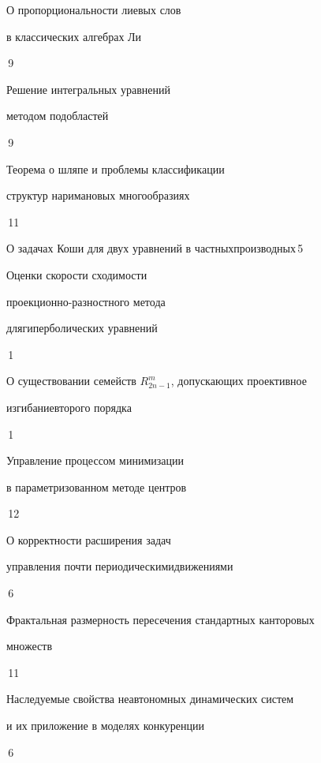 

{О пропорциональности лиевых слов 


в классических алгебрах Ли}{\No\,9}




{Решение интегральных уравнений


методом подобластей}{\No\,9}




{Теорема о шляпе и проблемы классификации 


структур на\newline римановых многообразиях}{\No\,11}




{О задачах Коши для двух уравнений в частных\newline производных}{\No\,5}




{Оценки скорости сходимости


проекционно-разностного метода


для\newline гиперболических уравнений}{\No\,1}




{О существовании семейств $R^m_{2n-1}$, допускающих проективное 


изгибание\newline второго порядка}{\No\,1}




{Управление процессом минимизации \newline


в параметризованном методе центров}{\No\,12}




{О корректности расширения задач


управления почти периодическими\newline движениями}{\No\,6}




{Фрактальная размерность пересечения стандартных канторовых \newline


множеств}{\No\,11}




{Наследуемые свойства неавтономных динамических систем\newline


и их приложение в моделях конкуренции}{\No\,6}


